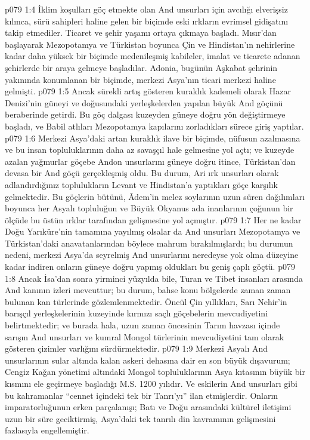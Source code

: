 \vs p079 1:4 İklim koşulları göç etmekte olan And unsurları için avcılığı elverişsiz kılınca, sürü sahipleri haline gelen bir biçimde eski ırkların evrimsel gidişatını takip etmediler. Ticaret ve şehir yaşamı ortaya çıkmaya başladı. Mısır’dan başlayarak Mezopotamya ve Türkistan boyunca Çin ve Hindistan’ın nehirlerine kadar daha yüksek bir biçimde medenileşmiş kabileler, imalat ve ticarete adanan şehirlerde bir araya gelmeye başladılar. Adonia, bugünün Aşkabat şehrinin yakınında konumlanan bir biçimde, merkezi Asya’nın ticari merkezi haline gelmişti.
\vs p079 1:5 Ancak sürekli artış gösteren kuraklık kademeli olarak Hazar Denizi’nin güneyi ve doğusundaki yerleşkelerden yapılan büyük And göçünü beraberinde getirdi. Bu göç dalgası kuzeyden güneye doğru yön değiştirmeye başladı, ve Babil atlıları Mezopotamya kapılarını zorladıkları sürece giriş yaptılar.
\vs p079 1:6 Merkezi Asya’daki artan kuraklık ilave bir biçimde, nüfusun azalmasına ve bu insan topluluklarının daha az savaşçıl hale gelmesine yol açtı; ve kuzeyde azalan yağmurlar göçebe Andon unsurlarını güneye doğru itince, Türkistan’dan devasa bir And göçü gerçekleşmiş oldu. Bu durum, Ari ırk unsurları olarak adlandırdığınız toplulukların Levant ve Hindistan’a yaptıkları göçe karşılık gelmektedir. Bu göçlerin bütünü, Âdem’in melez soylarının uzun süren dağılımları boyunca her Asyalı topluluğun ve Büyük Okyanus ada inanlarının çoğunun bir ölçüde bu üstün ırklar tarafından gelişmesine yol açmıştır.
\vs p079 1:7 Her ne kadar Doğu Yarıküre’nin tamamına yayılmış olsalar da And unsurları Mezopotamya ve Türkistan’daki anavatanlarından böylece mahrum bırakılmışlardı; bu durumun nedeni, merkezi Asya’da seyrelmiş And unsurlarını neredeyse yok olma düzeyine kadar indiren onların güneye doğru yapmış oldukları bu geniş çaplı göçtü.
\vs p079 1:8 Ancak İsa’dan sonra yirminci yüzyılda bile, Turan ve Tibet insanları arasında And kanının izleri mevcuttur; bu durum, bahse konu bölgelerde zaman zaman bulunan kan türlerinde gözlemlenmektedir. Öncül Çin yıllıkları, Sarı Nehir’in barışçıl yerleşkelerinin kuzeyinde kırmızı saçlı göçebelerin mevcudiyetini belirtmektedir; ve burada hala, uzun zaman öncesinin Tarım havzası içinde sarışın And unsurları ve kumral Mongol türlerinin mevcudiyetini tam olarak gösteren çizimler varlığını sürdürmektedir.
\vs p079 1:9 Merkezi Asyalı And unsurlarının sular altında kalan askeri dehasına dair en son büyük dışavurum; Cengiz Kağan yönetimi altındaki Mongol topluluklarının Asya kıtasının büyük bir kısmını ele geçirmeye başladığı M.S. 1200 yılıdır. Ve eskilerin And unsurları gibi bu kahramanlar “cennet içindeki tek bir Tanrı’yı” ilan etmişlerdir. Onların imparatorluğunun erken parçalanışı; Batı ve Doğu arasındaki kültürel iletişimi uzun bir süre geciktirmiş, Asya’daki tek tanrılı din kavramının gelişmesini fazlasıyla engellemiştir.
